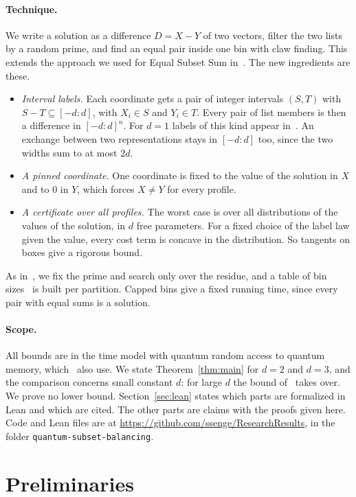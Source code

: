 \documentclass[11pt]{article}
\theoremstyle{remark}
\newcommand{\cc}[1]{[-#1:#1]}
\begin{document}
\paragraph{Technique.} We write a solution as a difference $D=X-Y$ of two vectors, filter the two lists by a random prime, and find an equal pair inside one bin with claw finding. This extends the approach we used for Equal Subset Sum in~\cite{Sen26}. The new ingredients are these.
\begin{itemize}[leftmargin=1.5em]
\item \emph{Interval labels.} Each coordinate gets a pair of integer intervals $(S,T)$ with $S-T\subseteq\cc d$, with $X_i\in S$ and $Y_i\in T$. Every pair of list members is then a difference in $\cc d^n$. For $d=1$ labels of this kind appear in~\cite{Ye26}. An exchange between two representations stays in $\cc d$ too, since the two widths sum to at most $2d$.
\item \emph{A pinned coordinate.} One coordinate is fixed to the value of the solution in $X$ and to $0$ in $Y$, which forces $X\ne Y$ for every profile.
\item \emph{A certificate over all profiles.} The worst case is over all distributions of the values of the solution, in $d$ free parameters. For a fixed choice of the label law given the value, every cost term is concave in the distribution. So tangents on boxes give a rigorous bound.
\end{itemize}
As in~\cite{CKLM26,Sen26}, we fix the prime and search only over the residue, and a table of bin sizes~\cite{AHJKS22} is built per partition. Capped bins give a fixed running time, since every pair with equal sums is a solution.

\paragraph{Scope.} All bounds are in the time model with quantum random access to quantum memory, which~\cite{AHJKS22,CKLM26} also use. We state Theorem~\ref{thm:main} for $d=2$ and $d=3$, and the comparison concerns small constant $d$: for large $d$ the bound of~\cite{GFHP26} takes over. We prove no lower bound. Section~\ref{sec:lean} states which parts are formalized in Lean and which are cited. The other parts are claims with the proofs given here. Code and Lean files are at \url{https://github.com/ssenge/ResearchResults}, in the folder \texttt{quantum-subset-balancing}.

\section{Preliminaries}
\end{document}
